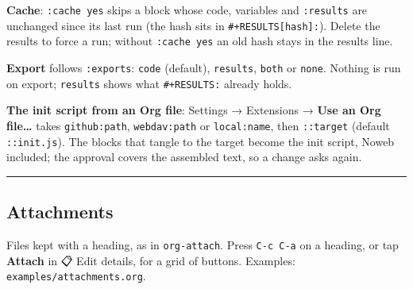 \documentclass[11pt]{article}
\begin{document}
\textbf{Cache}: \texttt{:cache yes} skips a block whose code, variables and \texttt{:results} are unchanged since its last run (the hash sits in \texttt{\#+RESULTS[hash]:}). Delete the results to force a run; without \texttt{:cache yes} an old hash stays in the results line.

\textbf{Export} follows \texttt{:exports}: \texttt{code} (default), \texttt{results}, \texttt{both} or \texttt{none}. Nothing is run on export; \texttt{results} shows what \texttt{\#+RESULTS:} already holds.

\textbf{The init script from an Org file}: Settings → Extensions → \textbf{Use an Org file…} takes \texttt{github:path}, \texttt{webdav:path} or \texttt{local:name}, then \texttt{::target} (default \texttt{::init.js}). The blocks that tangle to the target become the init script, Noweb included; the approval covers the assembled text, so a change asks again.

\noindent\rule{\textwidth}{0.5pt}

\subsection{Attachments}
\label{sec:org970e59b}
Files kept with a heading, as in \texttt{org-attach}. Press \texttt{C-c C-a} on a heading, or tap \textbf{Attach} in 📋 Edit details, for a grid of buttons. Examples: \texttt{examples/attachments.org}.
\end{document}
